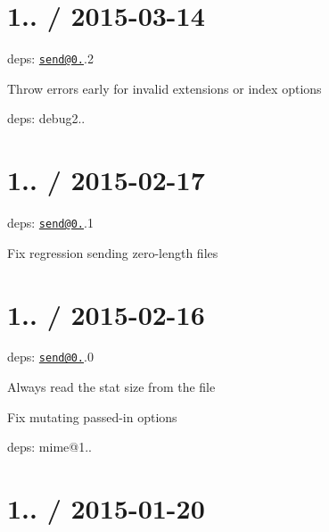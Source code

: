 \section*{1.. / 2015-\/03-\/14 }


\begin{DoxyItemize}
\item deps\+: \href{mailto:send@0.12}{\tt send@0.}.2
\begin{DoxyItemize}
\item Throw errors early for invalid {\ttfamily extensions} or {\ttfamily index} options
\item deps\+: debug2..
\end{DoxyItemize}
\end{DoxyItemize}

\section*{1.. / 2015-\/02-\/17 }


\begin{DoxyItemize}
\item deps\+: \href{mailto:send@0.12}{\tt send@0.}.1
\begin{DoxyItemize}
\item Fix regression sending zero-\/length files
\end{DoxyItemize}
\end{DoxyItemize}

\section*{1.. / 2015-\/02-\/16 }


\begin{DoxyItemize}
\item deps\+: \href{mailto:send@0.12}{\tt send@0.}.0
\begin{DoxyItemize}
\item Always read the stat size from the file
\item Fix mutating passed-\/in {\ttfamily options}
\item deps\+: mime@1..
\end{DoxyItemize}
\end{DoxyItemize}

\section*{1.. / 2015-\/01-\/20 }


